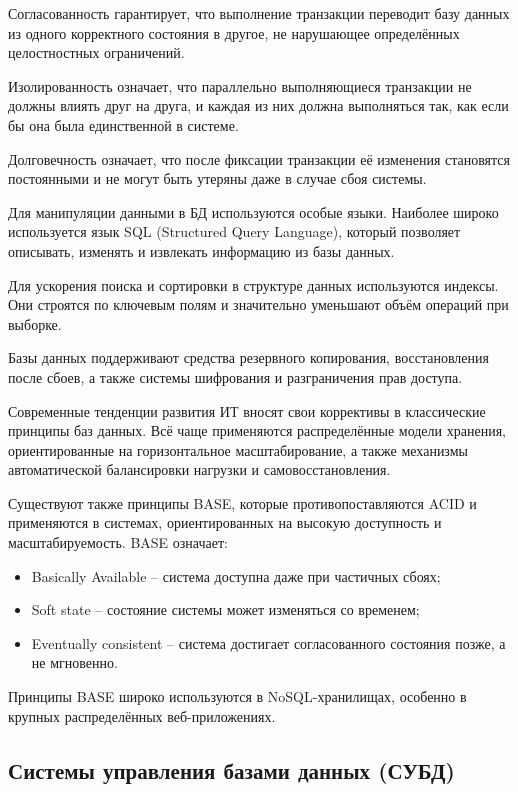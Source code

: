 Согласованность гарантирует, что выполнение транзакции переводит базу данных из одного корректного состояния в другое, не нарушающее определённых целостностных ограничений.

Изолированность означает, что параллельно выполняющиеся транзакции не должны влиять друг на друга, и каждая из них должна выполняться так, как если бы она была единственной в системе.

Долговечность означает, что после фиксации транзакции её изменения становятся постоянными и не могут быть утеряны даже в случае сбоя системы.

Для манипуляции данными в БД используются особые языки.	Наиболее широко используется язык SQL (Structured Query Language), который позволяет описывать, изменять и извлекать информацию из базы данных.	
		
Для ускорения поиска и сортировки в структуре данных используются индексы. Они строятся по ключевым полям и значительно уменьшают объём операций при выборке.

Базы данных поддерживают средства резервного копирования, восстановления после сбоев, а также системы шифрования и разграничения прав доступа.

Современные тенденции развития ИТ вносят свои коррективы в классические принципы баз данных. Всё чаще применяются распределённые модели хранения, ориентированные на горизонтальное масштабирование, а также механизмы автоматической балансировки нагрузки и самовосстановления.

Существуют также принципы BASE, которые противопоставляются ACID и применяются в системах, ориентированных на высокую доступность и масштабируемость. BASE означает:
\begin{itemize}
	\item Basically Available -- система доступна даже при частичных сбоях;
	\item Soft state -- состояние системы может изменяться со временем;
	\item Eventually consistent -- система достигает согласованного состояния позже, а не мгновенно.
 \end{itemize}
 
Принципы BASE широко используются в NoSQL-хранилищах, особенно в крупных распределённых веб-приложениях.
 
\subsection{Системы управления базами данных (СУБД)}

